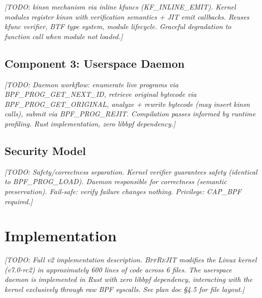 \documentclass[sigconf,anonymous]{acmart}
\begin{document}
\textit{[TODO: kinsn mechanism via inline kfuncs (KF\_INLINE\_EMIT).
Kernel modules register kinsn with verification semantics + JIT emit
callbacks. Reuses kfunc verifier, BTF type system, module lifecycle.
Graceful degradation to function call when module not loaded.]}

\subsection{Component 3: Userspace Daemon}
\label{sec:daemon}

\textit{[TODO: Daemon workflow: enumerate live programs via
BPF\_PROG\_GET\_NEXT\_ID, retrieve original bytecode via
BPF\_PROG\_GET\_ORIGINAL, analyze + rewrite bytecode (may insert kinsn
calls), submit via BPF\_PROG\_REJIT. Compilation passes informed by
runtime profiling. Rust implementation, zero libbpf dependency.]}

\subsection{Security Model}
\label{sec:security}

\textit{[TODO: Safety/correctness separation. Kernel verifier guarantees
safety (identical to BPF\_PROG\_LOAD). Daemon responsible for
correctness (semantic preservation). Fail-safe: verify failure changes
nothing. Privilege: CAP\_BPF required.]}

\section{Implementation}
\label{sec:implementation}


\textit{[TODO: Full v2 implementation description. \textsc{BpfReJIT}
modifies the Linux kernel (v7.0-rc2) in approximately 600 lines of
code across 6 files. The userspace daemon is implemented in Rust with
zero libbpf dependency, interacting with the kernel exclusively through
raw BPF syscalls. See plan doc \S4.5 for file layout.]}
\end{document}
